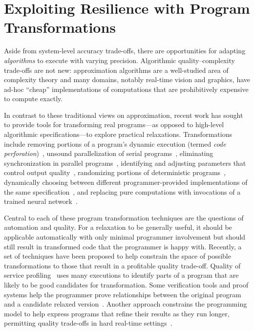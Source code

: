 \section{Exploiting Resilience with Program Transformations}
\label{sec:related:software}

Aside from system-level accuracy trade-offs, there are opportunities for
adapting \emph{algorithms} to execute with varying precision. Algorithmic
quality--complexity trade-offs are not new: approximation algorithms are a
well-studied area of complexity theory and many domains, notably real-time
vision and graphics, have ad-hoc ``cheap'' implementations of computations
that are prohibitively expensive to compute exactly.

In contrast to these
traditional views on approximation, recent work has sought to provide
tools for transforming real programs---as opposed to high-level
algorithmic specifications---to explore practical relaxations.
Transformations include removing portions of a program's dynamic execution
(termed \emph{code perforation})~\cite{perforation-fse}, unsound
parallelization of serial programs~\cite{quickstep}, eliminating
synchronization in parallel programs~\cite{dubstep, races-ibm, hogwild},
identifying and adjusting parameters that control output
quality~\cite{dynamicknobs}, randomizing portions of deterministic
programs~\cite{zhu-popl12, sasa-sas11}, dynamically choosing between
different programmer-provided implementations of the same
specification~\cite{green}, and replacing pure computations with invocations
of a trained neural network~\cite{benchnn, temam-isca}.

Central to each of these program transformation techniques are the questions
of automation and quality. For a relaxation to be generally useful, it should
be applicable automatically with only minimal programmer involvement but
should still result in transformed code that the programmer is happy with.
Recently, a set of techniques have been proposed to help constrain the space
of possible transformations to those that result in a profitable
quality trade-off. Quality of service profiling~\cite{qosprof} uses many
executions to identify parts of a program that are likely to be good
candidates for transformation. Some verification tools and proof systems help
the programmer prove relationships between the original program and a
candidate relaxed version~\cite{carbin-pldi, carbin-races, carbin-pepm,
rice-transformation-semantics}.
Another approach constrains the programming model to help express programs
that refine their results as they run longer, permitting quality trade-offs in
hard real-time settings~\cite{chung90}.

